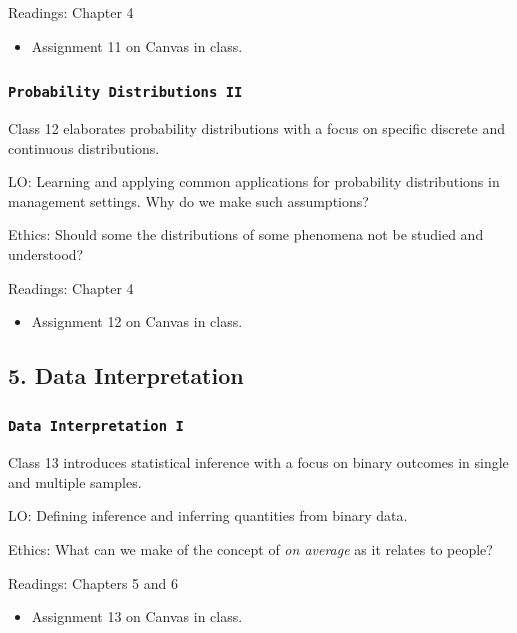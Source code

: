 \documentclass[11pt,]{article}
\begin{document}
Readings: Chapter 4

\begin{itemize}
\item Assignment 11 on Canvas in class.
\end{itemize}

\subsubsection{\texorpdfstring{\texttt{Probability\ Distributions\ II}}{Probability Distributions II}}\label{probability-distributions-ii}

Class 12 elaborates probability distributions with a focus on specific
discrete and continuous distributions.

LO: Learning and applying common applications for probability
distributions in management settings. Why do we make such assumptions?

Ethics: Should some the distributions of some phenomena not be studied
and understood?

Readings: Chapter 4

\begin{itemize}
\item Assignment 12 on Canvas in class.
\end{itemize}

\subsection{5. Data Interpretation}\label{data-interpretation}

\subsubsection{\texorpdfstring{\texttt{Data\ Interpretation\ I}}{Data Interpretation I}}\label{data-interpretation-i}

Class 13 introduces statistical inference with a focus on binary
outcomes in single and multiple samples.

LO: Defining inference and inferring quantities from binary data.

Ethics: What can we make of the concept of \emph{on average} as it
relates to people?

Readings: Chapters 5 and 6

\begin{itemize}
\item Assignment 13 on Canvas in class.
\end{itemize}
\end{document}
